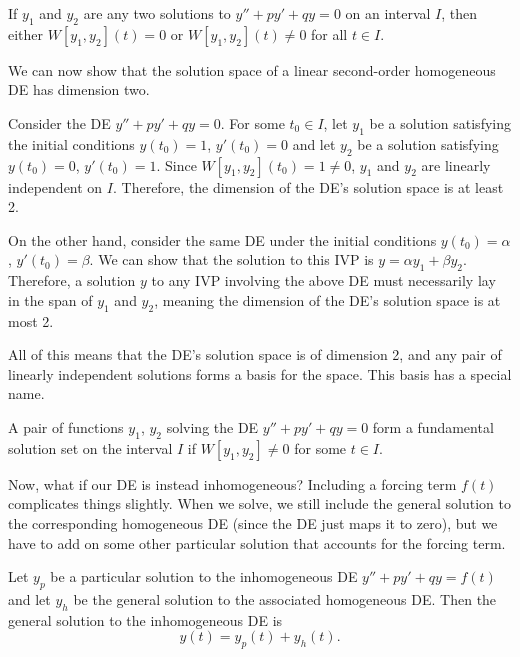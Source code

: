 \documentclass[../m082main.tex]{subfiles}
\begin{document}
\begin{corollary}[$W(t_0) = 0$ implies identially zero]
    If $y_1$ and $y_2$ are any two solutions to $y'' + py' + qy = 0$ on an interval $I$, then either $W[y_1, y_2](t) = 0$ or $W[y_1, y_2](t) \neq 0$ for all $t \in I$.
\end{corollary}

We can now show that the solution space of a linear second-order homogeneous DE has dimension two.

Consider the DE $y'' + py' + qy = 0$.
For some $t_0 \in I$, let $y_1$ be a solution satisfying the initial conditions $y(t_0) = 1$, $y'(t_0) = 0$ and let $y_2$ be a solution satisfying $y(t_0) = 0$, $y'(t_0) = 1$.
Since $W[y_1, y_2](t_0) = 1 \neq 0$, $y_1$ and $y_2$ are linearly independent on $I$.
Therefore, the dimension of the DE's solution space is at least 2.

On the other hand, consider the same DE under the initial conditions $y(t_0) = \alpha$, $y'(t_0) = \beta$.
We can show that the solution to this IVP is $y = \alpha y_1 + \beta y_2$.
Therefore, a solution $y$ to any IVP involving the above DE must necessarily lay in the span of $y_1$ and $y_2$, meaning the dimension of the DE's solution space is at most 2.

All of this means that the DE's solution space is of dimension 2, and any pair of linearly independent solutions forms a basis for the space.
This basis has a special name.

\begin{definition}
    A pair of functions $y_1$, $y_2$ solving the DE $y'' + py' + qy = 0$ form a fundamental solution set on the interval $I$ if $W[y_1, y_2] \neq 0$ for some $t \in I$.
\end{definition}

Now, what if our DE is instead inhomogeneous?
Including a forcing term $f(t)$ complicates things slightly.
When we solve, we still include the general solution to the corresponding homogeneous DE (since the DE just maps it to zero), but we have to add on some other particular solution that accounts for the forcing term.

\begin{theorem}
    Let $y_p$ be a particular solution to the inhomogeneous DE $y'' + py' + qy = f(t)$ and let $y_h$ be the general solution to the associated homogeneous DE.
    Then the general solution to the inhomogeneous DE is
    \[ y(t) = y_p(t) + y_h(t). \]
\end{theorem}
\end{document}

